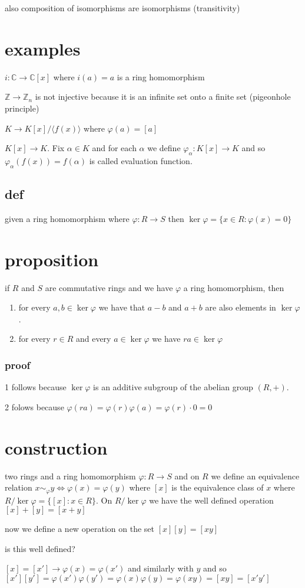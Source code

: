 \documentclass[letterpaper]{article}
\begin{document}
also composition of isomorphisms are isomorphisms (transitivity)
\section*{examples}
$i:\mathbb{C}\to\mathbb{C}[x]$ where $i(a)=a$ is a ring homomorphism

$\mathbb{Z}\to\mathbb{Z}_n$ is not injective because it is an infinite set onto a finite set (pigeonhole principle)

$K\to K[x]/\langle f(x)\rangle$ where $\varphi(a)=[a]$

$K[x]\to K$. Fix $\alpha\in K$ and for each $\alpha$ we define $\varphi_\alpha:K[x]\to K$ and so $\varphi_{\alpha}(f(x))=f(\alpha)$ is called evaluation function.

\subsection*{def}
given a ring homomorphism where $\varphi:R\to S$ then $\ker \varphi=\{x\in R:\varphi(x)=0\}$


\section*{proposition}
if $R$ and $S$ are commutative rings and we have $\varphi$ a ring homomorphism, then
\begin{enumerate}
\item
for every $a,b\in\ker\varphi$ we have that $a-b$ and $a+b$ are also elements in $\ker\varphi$.
\item
for every $r\in R$ and every $a\in\ker\varphi$ we have $ra\in\ker\varphi$
\end{enumerate}
\subsubsection*{proof}
1 follows because $\ker\varphi$ is an additive subgroup of the abelian group $(R,+)$.

2 folows because $\varphi(ra)=\varphi(r)\varphi(a)=\varphi(r)\cdot0=0$

\section*{construction}
two rings and a ring homomorphism $\varphi:R\to S$ and on $R$ we define an equivalence relation $x\sim_\varphi y\Leftrightarrow \varphi(x)=\varphi(y)$ where $[x]$ is the equivalence class of $x$ where $R/\ker\varphi=\{[x]:x\in R\}$. On $R/\ker\varphi$ we have the well defined operation $[x]+[y]=[x+y]$

now we define a new operation on the set $[x][y]=[xy]$

is this well defined?

$[x]=[x']\to\varphi(x)=\varphi(x')$ and similarly with $y$ and so $[x'][y']=\varphi(x')\varphi(y')=\varphi(x)\varphi(y)=\varphi(xy)=[xy]=[x'y']$
\end{document}
